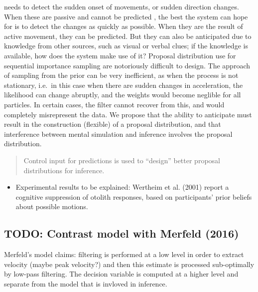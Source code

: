 \documentclass[english,floatsintext,man]{apa6}
\providecommand{\tightlist}{%
  \setlength{\itemsep}{0pt}\setlength{\parskip}{0pt}}
\theoremstyle{definition}
\theoremstyle{definition}
\theoremstyle{remark}
\begin{document}
\begin{itemize}
  needs to detect the sudden onset of movements, or sudden direction
  changes. When these are passive and cannot be predicted , the best the
  system can hope for is to detect the changes as quickly as possible.
  When they are the result of active movement, they can be predicted.
  But they can also be anticipated due to knowledge from other sources,
  such as visual or verbal clues; if the knowledge is available, how
  does the system make use of it? Proposal distribution use for
  sequential importance sampling are notoriously difficult to design.
  The approach of sampling from the prior can be very inefficient, as
  when the process is not stationary, i.e.~in this case when there are
  sudden changes in acceleration, the likelihood can change abruptly,
  and the weights would become neglible for all particles. In certain
  cases, the filter cannot recover from this, and would completely
  misrepresent the data. We propose that the ability to anticipate must
  result in the construction (flexible) of a proposal distribution, and
  that interference between mental simulation and inference involves the
  proposal distribution.
\end{itemize}

\begin{quote}
Control input for predictions is used to \enquote{design} better
proposal distributions for inference.
\end{quote}

\begin{itemize}
\tightlist
\item
  Experimental results to be explained: Wertheim et al. (2001) report a
  cognitive suppression of otolith responses, based on participants'
  prior beliefs about possible motions.
\end{itemize}

\subsection{TODO: Contrast model with Merfeld
(2016)}\label{todo-contrast-model-with-merfeld-2016}

Merfeld's model claims: filtering is performed at a low level in order
to extract velocity (maybe peak velocity?) and then this estimate is
processed sub-optimally by low-pass filtering. The decision variable is
computed at a higher level and separate from the model that is invloved
in inference.
\end{document}
